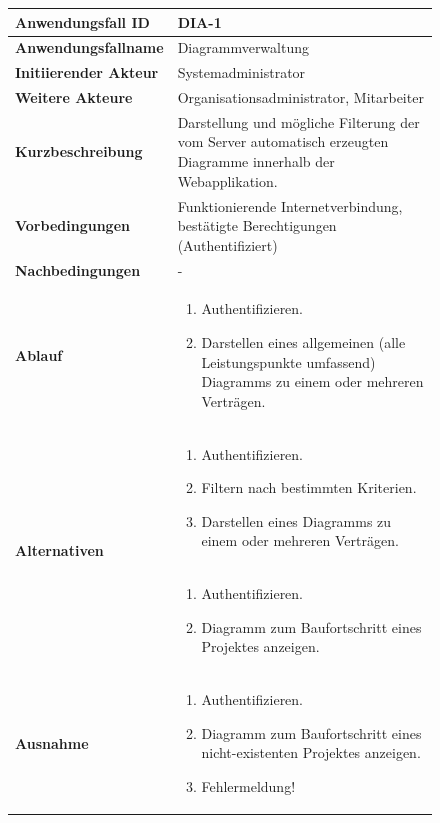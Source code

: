 \begin{figure}[h]
	\centering
	\begin{tabularx}{\textwidth}{ X | X }
		\textbf{Anwendungsfall ID} & DIA-1 \\ \hline
		\textbf{Anwendungsfallname} & Diagrammverwaltung \\ \hline
		\textbf{Initiierender Akteur} & Systemadministrator \\ \hline
		\textbf{Weitere Akteure} & Organisationsadministrator, Mitarbeiter \\ \hline
		\textbf{Kurzbeschreibung} & Darstellung und mögliche Filterung der vom Server automatisch erzeugten Diagramme innerhalb der Webapplikation.  \\ \hline
		\textbf{Vorbedingungen} & Funktionierende Internetverbindung, bestätigte Berechtigungen (Authentifiziert)  \\ \hline
		\textbf{Nachbedingungen} &  -  \\ \hline
		\textbf{Ablauf} &
		\begin{enumerate}
			\item Authentifizieren.
			\item Darstellen eines allgemeinen (alle Leistungspunkte umfassend) Diagramms zu einem oder mehreren Verträgen.
		\end{enumerate} \\ \hline
		\multirow{2}{*}{\textbf{Alternativen}} &
		\begin{enumerate}
			\item Authentifizieren.
			\item Filtern nach bestimmten Kriterien.
			\item Darstellen eines Diagramms zu einem oder mehreren Verträgen.
		\end{enumerate} \\\cline{2-2} &
		\begin{enumerate}
			\item Authentifizieren.
			\item Diagramm zum Baufortschritt eines Projektes anzeigen.
		\end{enumerate}  \\ \hline
		\multirow{2}{*}{\textbf{Ausnahme}} &
		\begin{enumerate} %
			\item Authentifizieren.
			\item Diagramm zum Baufortschritt eines nicht-existenten Projektes anzeigen.
			\item Fehlermeldung!

\end{enumerate}
\end{tabularx}
\end{figure}
